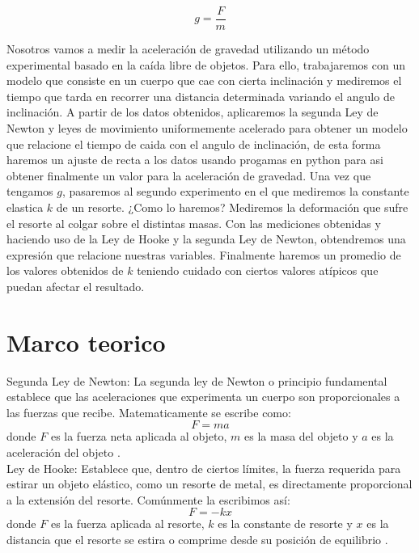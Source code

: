\documentclass{article}
\begin{document}
\begin{equation}
g = \frac{F}{m}
\end{equation}

Nosotros vamos a medir la aceleración de gravedad utilizando un método
experimental basado en la caída libre de objetos. Para ello, trabajaremos
con un modelo que consiste en un cuerpo que cae con cierta inclinación y
mediremos el tiempo que tarda en recorrer una distancia determinada
variando el angulo de inclinación. A partir de los datos obtenidos, 
aplicaremos la segunda Ley de Newton y leyes de movimiento uniformemente
acelerado para obtener un modelo que relacione el tiempo de caida con el
angulo de inclinación, de esta forma haremos un ajuste de recta a los datos
usando progamas en python para asi obtener finalmente un valor para la
aceleración de gravedad. Una vez que tengamos $g$, pasaremos al segundo 
experimento en el que mediremos la constante elastica $k$ de un resorte.
¿Como lo haremos? Mediremos la deformación que sufre el resorte al colgar
sobre el distintas masas. Con las 
mediciones obtenidas y haciendo uso de la Ley de Hooke y la segunda Ley de 
Newton, obtendremos una expresión que relacione nuestras variables. 
Finalmente haremos un promedio de los valores obtenidos de $k$ teniendo 
cuidado con ciertos valores atípicos que puedan afectar el resultado.

\section*{Marco teorico}
Segunda Ley de Newton: La segunda ley de Newton o principio fundamental 
establece que las aceleraciones que experimenta un cuerpo son proporcionales 
a las fuerzas que recibe. Matematicamente se escribe como:
\begin{equation}
F = m a
\end{equation}
donde $F$ es la fuerza neta aplicada al objeto, $m$ es la masa del objeto
y $a$ es la aceleración del objeto \cite{fisicalab2025principio}. \\

Ley de Hooke: Establece que, dentro de ciertos límites, la fuerza requerida 
para estirar un objeto elástico, como un resorte de metal, es directamente 
proporcional a la extensión del resorte. Comúnmente la escribimos así:
\begin{equation}
F = -k x
\end{equation}
donde $F$ es la fuerza aplicada al resorte, $k$ es la constante de resorte
y $x$ es la distancia que el resorte se estira o comprime desde su
posición de equilibrio \cite{khan2019hooke}. \\
\end{document}
